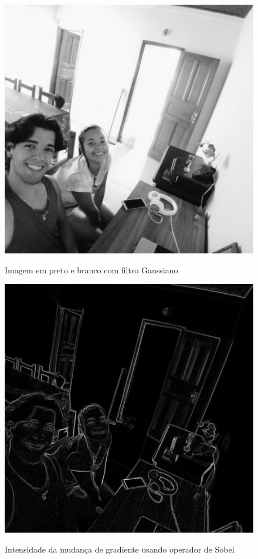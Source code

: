 \begin{figure}[!htb]
	\centering
    \caption{Imagem em preto e branco com filtro Gaussiano}
	\includegraphics[scale=0.25]{figuras/filter/sobel/f_normal.jpeg}
	\label{fig:Imagem em preto e branco com filtro de gaus}
\end{figure}

\begin{figure}[!htb]
	\centering
    \caption{Intensidade da mudança de gradiente usando operador de Sobel}
	\includegraphics[scale=0.25]{figuras/filter/sobel/f_sobel.jpeg}
	\label{fig:Intensidade da mudanca de gradiente}
\end{figure}



